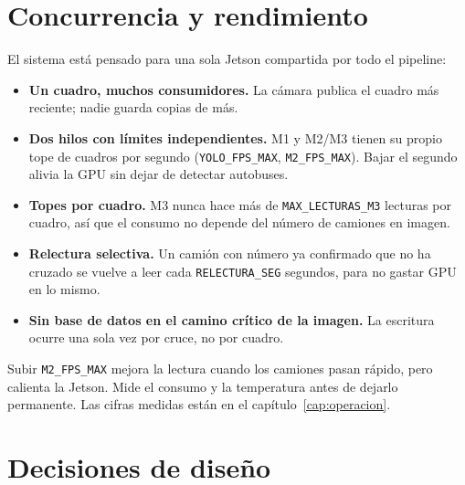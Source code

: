\section{Concurrencia y rendimiento}

El sistema está pensado para una sola Jetson compartida por todo el pipeline:

\begin{itemize}
  \item \textbf{Un cuadro, muchos consumidores.} La cámara publica el cuadro más
        reciente; nadie guarda copias de más.
  \item \textbf{Dos hilos con límites independientes.} M1 y M2/M3 tienen su
        propio tope de cuadros por segundo (\texttt{YOLO\_FPS\_MAX},
        \texttt{M2\_FPS\_MAX}). Bajar el segundo alivia la GPU sin dejar de
        detectar autobuses.
  \item \textbf{Topes por cuadro.} M3 nunca hace más de
        \texttt{MAX\_LECTURAS\_M3} lecturas por cuadro, así que el consumo no
        depende del número de camiones en imagen.
  \item \textbf{Relectura selectiva.} Un camión con número ya confirmado que no
        ha cruzado se vuelve a leer cada \texttt{RELECTURA\_SEG} segundos, para
        no gastar GPU en lo mismo.
  \item \textbf{Sin base de datos en el camino crítico de la imagen.} La
        escritura ocurre una sola vez por cruce, no por cuadro.
\end{itemize}

\begin{aviso}[title={Antes de subir los FPS}]
Subir \texttt{M2\_FPS\_MAX} mejora la lectura cuando los camiones pasan rápido,
pero calienta la Jetson. Mide el consumo y la temperatura antes de dejarlo
permanente. Las cifras medidas están en el capítulo~\ref{cap:operacion}.
\end{aviso}

\section{Decisiones de diseño}

